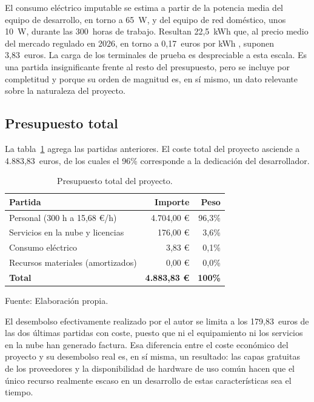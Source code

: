 El consumo eléctrico imputable se estima a partir de la potencia media del equipo de desarrollo, en torno a
65~W, y del equipo de red doméstico, unos 10~W, durante las 300~horas de trabajo. Resultan 22,5~kWh que, al
precio medio del mercado regulado en 2026, en torno a 0,17~euros por kWh \citep{PrecioLuz2026}, suponen
3,83~euros. La carga de los terminales de prueba es despreciable a esta escala. Es una partida
insignificante frente al resto del presupuesto, pero se incluye por completitud y porque su orden de
magnitud es, en sí mismo, un dato relevante sobre la naturaleza del proyecto.

\subsection{Presupuesto total}

La tabla~\ref{tab:presupuesto} agrega las partidas anteriores. El coste total del proyecto asciende a
4.883,83~euros, de los cuales el 96\% corresponde a la dedicación del desarrollador.

\begin{table}[htbp]
    \centering
    \caption{Presupuesto total del proyecto.}
    \label{tab:presupuesto}
    \begin{tabularx}{\textwidth}{@{}>{\RaggedRight\arraybackslash}X r r@{}}
        \toprule
        \textbf{Partida} & \textbf{Importe} & \textbf{Peso} \\
        \midrule
        Personal (300 h a 15,68 €/h)      & 4.704,00 € & 96,3\% \\
        Servicios en la nube y licencias  &   176,00 € &  3,6\% \\
        Consumo eléctrico                 &     3,83 € &  0,1\% \\
        Recursos materiales (amortizados) &     0,00 € &  0,0\% \\
        \midrule
        \textbf{Total}                    & \textbf{4.883,83 €} & \textbf{100\%} \\
        \bottomrule
    \end{tabularx}

    \vspace{2pt}
    {\footnotesize Fuente: Elaboración propia.}
\end{table}

El desembolso efectivamente realizado por el autor se limita a los 179,83~euros de las dos últimas partidas
con coste, puesto que ni el equipamiento ni los servicios en la nube han generado factura. Esa diferencia
entre el coste económico del proyecto y su desembolso real es, en sí misma, un resultado: las capas
gratuitas de los proveedores y la disponibilidad de hardware de uso común hacen que el único recurso
realmente escaso en un desarrollo de estas características sea el tiempo.


